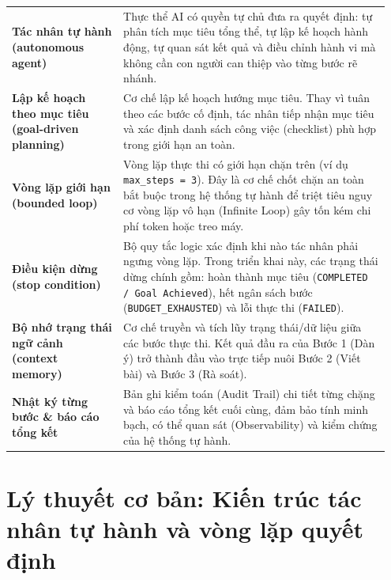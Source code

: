 \documentclass[]{article}
\newcommand{\thd}[1]{\cellcolor{primary}\textcolor{white}{\textbf{#1}}}
\begin{document}
\vspace{5.0mm}
{\centering
\renewcommand{\arraystretch}{1.08}
\begin{tabular}{|p{0.28\linewidth}|p{0.67\linewidth}|}
\hline
\thd{\raggedright Thuật ngữ\strut} & \thd{\raggedright Định nghĩa trong ngữ cảnh Checklist Agent\strut}\tabularnewline \hline
\raggedright \textbf{Tác nhân tự hành (autonomous agent)}\strut & \raggedright Thực thể AI có quyền tự chủ đưa ra quyết định: tự phân tích mục tiêu tổng thể, tự lập kế hoạch hành động, tự quan sát kết quả và điều chỉnh hành vi mà không cần con người can thiệp vào từng bước rẽ nhánh.\strut \tabularnewline \hline
\raggedright \textbf{Lập kế hoạch theo mục tiêu (goal-driven planning)}\strut & \raggedright Cơ chế lập kế hoạch hướng mục tiêu. Thay vì tuân theo các bước cố định, tác nhân tiếp nhận mục tiêu và xác định danh sách công việc (checklist) phù hợp trong giới hạn an toàn.\strut \tabularnewline \hline
\raggedright \textbf{Vòng lặp giới hạn (bounded loop)}\strut & \raggedright Vòng lặp thực thi có giới hạn chặn trên (ví dụ \texttt{max\_steps = 3}). Đây là cơ chế chốt chặn an toàn bắt buộc trong hệ thống tự hành để triệt tiêu nguy cơ vòng lặp vô hạn (Infinite Loop) gây tốn kém chi phí token hoặc treo máy.\strut \tabularnewline \hline
\raggedright \textbf{Điều kiện dừng (stop condition)}\strut & \raggedright Bộ quy tắc logic xác định khi nào tác nhân phải ngưng vòng lặp. Trong triển khai này, các trạng thái dừng chính gồm: hoàn thành mục tiêu (\texttt{COMPLETED / Goal Achieved}), hết ngân sách bước (\texttt{BUDGET\_EXHAUSTED}) và lỗi thực thi (\texttt{FAILED}).\strut \tabularnewline \hline
\raggedright \textbf{Bộ nhớ trạng thái ngữ cảnh (context memory)}\strut & \raggedright Cơ chế truyền và tích lũy trạng thái/dữ liệu giữa các bước thực thi. Kết quả đầu ra của Bước 1 (Dàn ý) trở thành đầu vào trực tiếp nuôi Bước 2 (Viết bài) và Bước 3 (Rà soát).\strut \tabularnewline \hline
\raggedright \textbf{Nhật ký từng bước \& báo cáo tổng kết}\strut & \raggedright Bản ghi kiểm toán (Audit Trail) chi tiết từng chặng và báo cáo tổng kết cuối cùng, đảm bảo tính minh bạch, có thể quan sát (Observability) và kiểm chứng của hệ thống tự hành.\strut \tabularnewline \hline
\end{tabular}\par}

\section{Lý thuyết cơ bản: Kiến trúc tác nhân tự hành và vòng lặp quyết định}\label{ly-thuyet-co-ban}
\end{document}

